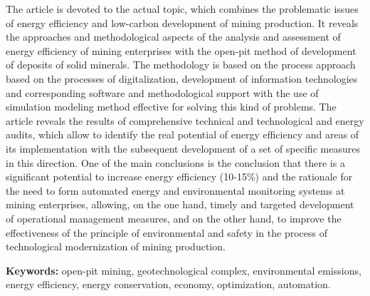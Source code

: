 \hspace{1.5em} The article is devoted to the actual topic, which combines the
problematic issues of energy efficiency and low-carbon development of
mining production. It reveals the approaches and methodological aspects
of the analysis and assessment of energy efficiency of mining
enterprises with the open-pit method of development of deposits of solid
minerals. The methodology is based on the process approach based on the
processes of digitalization, development of information technologies and
corresponding software and methodological support with the use of
simulation modeling method effective for solving this kind of problems.
The article reveals the results of comprehensive technical and
technological and energy audits, which allow to identify the real
potential of energy efficiency and areas of its implementation with the
subsequent development of a set of specific measures in this direction.
One of the main conclusions is the conclusion that there is a
significant potential to increase energy efficiency (10-15\%) and the
rationale for the need to form automated energy and environmental
monitoring systems at mining enterprises, allowing, on the one hand,
timely and targeted development of operational management measures, and
on the other hand, to improve the effectiveness of the principle of
environmental and safety in the process of technological modernization
of mining production.

\hspace{1.5em} {\bfseries Keywords:} open-pit mining, geotechnological complex,
environmental emissions, energy efficiency, energy conservation,
economy, optimization, automation.

\vspace{1em}

